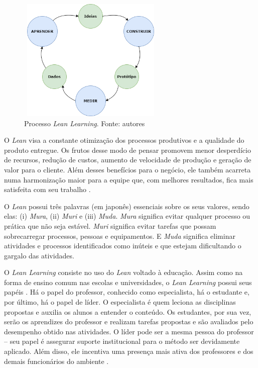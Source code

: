 \begin{figure}[!h]
    \centering
    \includegraphics[width=7cm,height=5.9cm]{Imagens/Lean.png}
    \caption{Processo \textit{Lean Learning}. Fonte: autores}
    \label{fig:Processo}
\end{figure}

O \textit{Lean} visa a constante otimização dos processos produtivos e a qualidade do produto entregue. Os frutos desse modo de pensar promovem menor desperdício de recursos, redução de custos, aumento de velocidade de produção e geração de valor para o cliente. Além desses benefícios para o negócio, ele também acarreta numa harmonização maior para a equipe que, com melhores resultados, fica mais satisfeita com seu trabalho \cite{poth2019lean}.

O \textit{Lean} possui três palavras (em japonês) essenciais sobre os seus valores, sendo elas: (i) \textit{Mura}, (ii) \textit{Muri} e (iii) \textit{Muda}. \textit{Mura} significa evitar qualquer processo ou prática que não seja estável. \textit{Muri} significa evitar tarefas que possam sobrecarregar processos, pessoas e equipamentos. E \textit{Muda} significa eliminar atividades e processos identificados como inúteis e que estejam dificultando o gargalo das atividades.

O \textit{Lean Learning} consiste no uso do \textit{Lean} voltado à educação. Assim como na forma de ensino comum nas escolas e universidades, o \textit{Lean Learning} possui seus papéis \cite{chatley2017lean}. Há o papel do professor, conhecido como especialista, há o estudante e, por último, há o papel de líder. O especialista é quem leciona as disciplinas propostas e auxilia os alunos a entender o conteúdo. Os estudantes, por sua vez, serão os aprendizes do professor e realizam tarefas propostas e são avaliados pelo desempenho obtido nas atividades. O líder pode ser a mesma pessoa do professor -- seu papel é assegurar suporte institucional para o método ser devidamente aplicado. Além disso, ele incentiva uma presença mais ativa dos professores e dos demais funcionários do ambiente \cite{madruga2018}.

